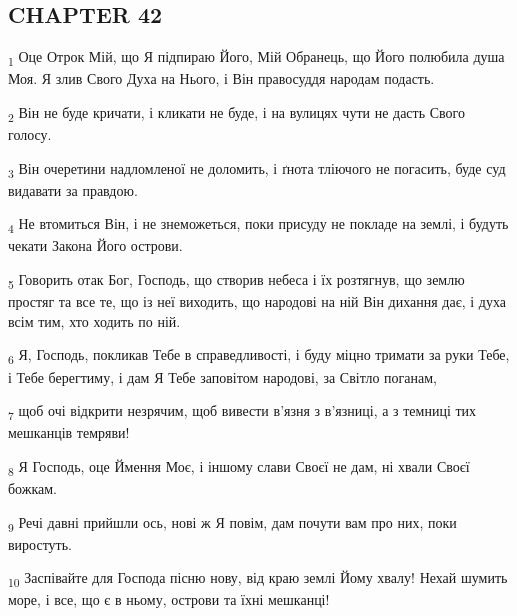 \subsection{CHAPTER 42}
\begin{tcolorbox}
\textsubscript{1} Оце Отрок Мій, що Я підпираю Його, Мій Обранець, що Його полюбила душа Моя. Я злив Свого Духа на Нього, і Він правосуддя народам подасть.
\end{tcolorbox}
\begin{tcolorbox}
\textsubscript{2} Він не буде кричати, і кликати не буде, і на вулицях чути не дасть Свого голосу.
\end{tcolorbox}
\begin{tcolorbox}
\textsubscript{3} Він очеретини надломленої не доломить, і ґнота тліючого не погасить, буде суд видавати за правдою.
\end{tcolorbox}
\begin{tcolorbox}
\textsubscript{4} Не втомиться Він, і не знеможеться, поки присуду не покладе на землі, і будуть чекати Закона Його острови.
\end{tcolorbox}
\begin{tcolorbox}
\textsubscript{5} Говорить отак Бог, Господь, що створив небеса і їх розтягнув, що землю простяг та все те, що із неї виходить, що народові на ній Він дихання дає, і духа всім тим, хто ходить по ній.
\end{tcolorbox}
\begin{tcolorbox}
\textsubscript{6} Я, Господь, покликав Тебе в справедливості, і буду міцно тримати за руки Тебе, і Тебе берегтиму, і дам Я Тебе заповітом народові, за Світло поганам,
\end{tcolorbox}
\begin{tcolorbox}
\textsubscript{7} щоб очі відкрити незрячим, щоб вивести в'язня з в'язниці, а з темниці тих мешканців темряви!
\end{tcolorbox}
\begin{tcolorbox}
\textsubscript{8} Я Господь, оце Ймення Моє, і іншому слави Своєї не дам, ні хвали Своєї божкам.
\end{tcolorbox}
\begin{tcolorbox}
\textsubscript{9} Речі давні прийшли ось, нові ж Я повім, дам почути вам про них, поки виростуть.
\end{tcolorbox}
\begin{tcolorbox}
\textsubscript{10} Заспівайте для Господа пісню нову, від краю землі Йому хвалу! Нехай шумить море, і все, що є в ньому, острови та їхні мешканці!
\end{tcolorbox}
